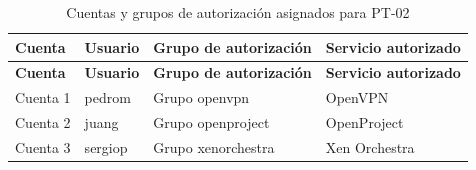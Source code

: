 \begingroup
\fontsize{8.5pt}{9.5pt}\selectfont
\renewcommand{\arraystretch}{1.3}
\setlength{\tabcolsep}{4pt}

\begin{longtable}{|
	>{\raggedright\arraybackslash}p{2.5cm}|
	>{\raggedright\arraybackslash}p{2.5cm}|
	>{\raggedright\arraybackslash}p{4.0cm}|
	>{\raggedright\arraybackslash}p{4.5cm}|}

	\caption{Cuentas y grupos de autorización asignados para PT-02}
	\label{tab:pt02-datos-prueba}
	\\
	\hline
	\tableheader
	\textbf{Cuenta}                &
	\textbf{Usuario}               &
	\textbf{Grupo de autorización} &
	\textbf{Servicio autorizado}
	\\
	\hline
	\endfirsthead

	\hline
	\tableheader
	\textbf{Cuenta}                &
	\textbf{Usuario}               &
	\textbf{Grupo de autorización} &
	\textbf{Servicio autorizado}
	\\
	\hline
	\endhead

	Cuenta 1                       & pedrom  & Grupo openvpn      & OpenVPN       \\ \hline
	Cuenta 2                       & juang   & Grupo openproject  & OpenProject   \\ \hline
	Cuenta 3                       & sergiop & Grupo xenorchestra & Xen Orchestra \\ \hline
\end{longtable}
\endgroup
\normalsize
